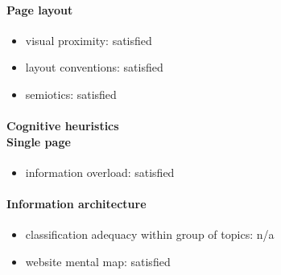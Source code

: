 \begin{enumerate}
	\paragraph*{Page layout}
	\begin{itemize}
		\item visual proximity: satisfied
		\item layout conventions: satisfied
		\item semiotics: satisfied
	\end{itemize}	
	
	\paragraph*{Cognitive heuristics \\ Single page}
	\begin{itemize}
		\item information overload: satisfied
	\end{itemize}	

	\paragraph*{Information architecture}
	\begin{itemize}
		\item classification adequacy within group of topics: n/a
		\item website mental map: satisfied
	\end{itemize}
\end{enumerate}